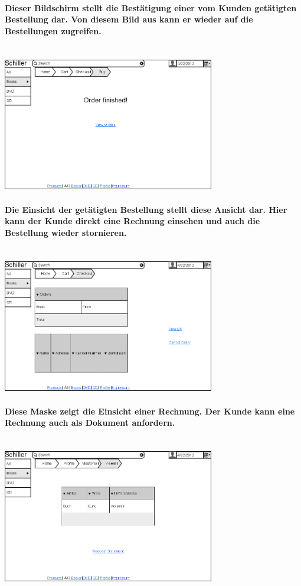 \documentclass[a4paper]{article}
\begin{document}
\paragraph{Dieser Bildschirm stellt die Bestätigung einer vom Kunden getätigten Bestellung dar. Von diesem Bild aus kann er wieder auf die Bestellungen zugreifen.\\ \\}
\includegraphics[width=350px]{10SuccessfullyOrdered.png}

\paragraph{Die Einsicht der getätigten Bestellung stellt diese Ansicht dar. Hier kann der Kunde direkt eine Rechnung einsehen und auch die Bestellung wieder stornieren.\\ \\}
\includegraphics[width=350px]{11OrderView.png}

\paragraph{Diese Maske zeigt die Einsicht einer Rechnung. Der Kunde kann eine Rechnung auch als Dokument anfordern.\\ \\}
\includegraphics[width=350px]{12BillView.png}
\end{document}
